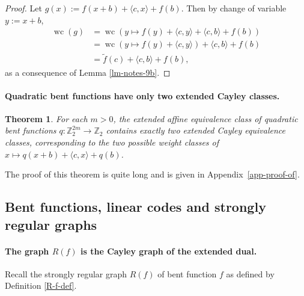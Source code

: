 \documentclass[12pt,a4paper]{article}
\newcommand{\mb}[1]{\mathbb{#1}}
\newcommand{\Z}{\mb{Z}}
\newcommand{\To}{\rightarrow}
\newcommand{\dual}[1]{\widetilde{#1}}
\newcommand{\weightclass}[1]{\operatorname{wc}\left(#1\right)}
\newtheorem{Theorem}{Theorem}
\begin{document}
\begin{proof}
Let $g(x) := f(x+b) + \langle c, x \rangle + f(b)$.
Then by change of variable $y:=x+b$,
\begin{align*}
\weightclass{g}
&=
\weightclass{y \mapsto f(y) + \langle c, y \rangle + \langle c, b \rangle + f(b)}
\\
&=
\weightclass{y \mapsto f(y) + \langle c, y \rangle} + \langle c, b \rangle + f(b)
\\
&=
\dual{f}(c) + \langle c, b \rangle + f(b),
\end{align*}
as a consequence of Lemma \ref{lm-notes-9b}.
\end{proof}


\paragraph*{Quadratic bent functions have only two extended Cayley classes.}
\begin{Theorem}
\label{th-Quadratic-Classes}
For each $m>0$, the extended affine equivalence class of quadratic bent functions
$q : \Z_2^{2m} \To \Z_2$ contains exactly two extended Cayley equivalence classes,
corresponding to the two possible weight classes of
$x \mapsto q(x+b) + \langle c, x \rangle + q(b)$.
\end{Theorem}

The proof of this theorem is quite long and is given in Appendix~\ref{app-proof-of}.

\subsection{Bent functions, linear codes and strongly regular graphs}
\paragraph*{The graph $R(f)$ is the Cayley graph of the extended dual.}
Recall the strongly regular graph $R(f)$ of bent function $f$ as defined by Definition
\ref{R-f-def}.
\end{document}
